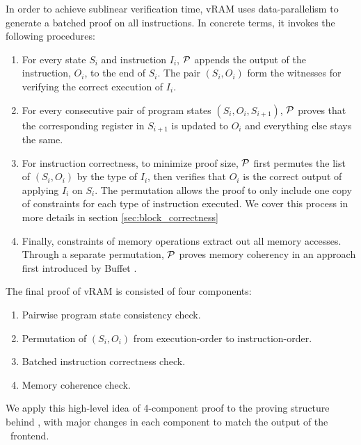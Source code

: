 In order to achieve sublinear verification time, vRAM uses data-parallelism to generate a batched proof on all instructions. In concrete terms, it invokes the following procedures:
\begin{enumerate}
    \item For every state $S_i$ and instruction $I_i$, $\P$ appends the output of the instruction, $O_i$, to the end of $S_i$. The pair $(S_i, O_i)$ form the witnesses for verifying the correct execution of $I_i$.
    \item For every consecutive pair of program states $(S_i, O_i, S_{i+1})$, $\P$ proves that the corresponding register in $S_{i+1}$ is updated to $O_i$ and everything else stays the same.
    \item For instruction correctness, to minimize proof size, $\P$ first permutes the list of $(S_i, O_i)$ by the type of $I_i$, then verifies that $O_i$ is the correct output of applying $I_i$ on $S_i$. The permutation allows the proof to only include one copy of constraints for each type of instruction executed. We cover this process in more details in section \ref{sec:block_correctness}
    \item Finally, constraints of memory operations extract out all memory accesses. Through a separate permutation, $\P$ proves memory coherency in an approach first introduced by Buffet \cite{wahby14buffet}.
\end{enumerate}

The final proof of vRAM is consisted of four components:
\begin{enumerate}
    \item Pairwise program state consistency check.
    \item Permutation of $(S_i, O_i)$ from execution-order to instruction-order.
    \item Batched instruction correctness check.
    \item Memory coherence check.
\end{enumerate}

We apply this high-level idea of 4-component proof to the proving structure behind \CoBBl, with major changes in each component to match the output of the \CoBBl~frontend.

